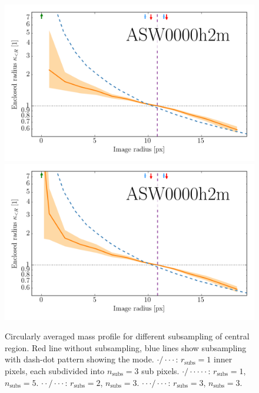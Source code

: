 \documentclass[fleqn,usenatbib]{mnras}
\begin{document}
\begin{figure}
  \includegraphics[width=\linewidth]{img/hires_comparison/ASW0000h2m_7022_11_hires_comparison}
  \includegraphics[width=\linewidth]{img/hires_comparison/ASW0000h2m_7022_13_hires_comparison}
  \caption{
    Circularly averaged mass profile for different subsampling of central region.
    Red line without subsampling, blue lines show subsampling with dash-dot pattern showing the mode.
    $\cdot / \cdot \cdot \cdot$: $r_\text{subs}=1$ inner pixels, each subdivided into $n_\text{subs}=3$ sub pixels.
    $\cdot / \cdot \cdot \cdot \cdot \cdot$: $r_\text{subs}=1$, $n_\text{subs}=5$.
    $\cdot \cdot / \cdot \cdot \cdot $: $r_\text{subs}=2$, $n_\text{subs}=3$.
    $\cdot \cdot \cdot / \cdot \cdot \cdot $: $r_\text{subs}=3$, $n_\text{subs}=3$.
    }
  \label{fig:subsampling}
\end{figure}
\end{document}
